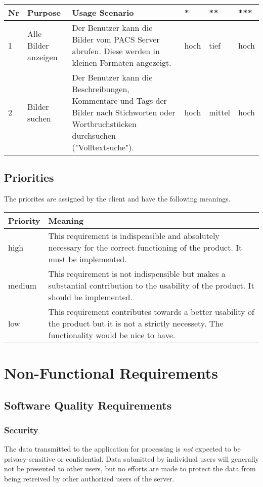 \documentclass[a4paper,draftmode]{srs}
\begin{document}
\begin{tabularx}{\textwidth}{
	>{\raggedright}p{0.5cm}
	>{\raggedright}p{2.4cm}
	>{\raggedright}X
	l
	l
	l
}
	  Nr
	& Purpose
	& Usage Scenario
	& *
	& **
	& ***
\\\toprule
	  1
	& Alle Bilder anzeigen
	& Der Benutzer kann die Bilder vom PACS Server abrufen.
	  Diese werden in kleinen Formaten angezeigt.
	& hoch & tief & hoch
\\\midrule
	  2
	& Bilder suchen
	& Der Benutzer kann die Beschreibungen, Kommentare und Tags der Bilder nach Stichworten
	  oder Wortbruchstücken durchsuchen ("Volltextsuche").
	& hoch & mittel & hoch
\\\bottomrule
\end{tabularx}

\subsection{Priorities}
The priorites are assigned by the client and have the following meanings.

\begin{tabularx}{\textwidth}{l|X}
	Priority & Meaning
\\\hline
	  high
	& This requirement is indispensible and absolutely necessary for the correct functioning of the product. It must be implemented.
\\\hline
	  medium
	& This requirement is not indispensible but makes a substantial contribution to the usability of the product. It should be implemented.
\\\hline
	  low
	& This requirement contributes towards a better usability of the product but it is not a strictly necessety. The functionality would be nice to have.
\end{tabularx}

	\section{Non-Functional Requirements}

\subsection{Software Quality Requirements}
\subsubsection{Security}
The data transmitted to the application for processing is \emph{not} expected to be privacy-sensitive or confidential. Data submitted by individual users will generally not be presented to other users, but no efforts are made to protect the data from being retreived by other authorized users of the server.
\end{document}
